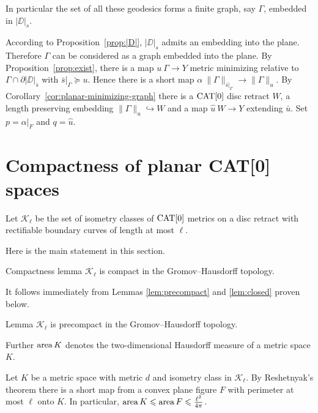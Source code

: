 \documentclass{article}
\begin{document}

In particular the set of all these geodesics forms a finite graph, say $\Gamma$,
embedded in $|\DD|_s$. 

According to Proposition~\ref{prop:|D|},
$|\DD|_s$ admits an embedding into the plane.
Therefore $\Gamma$ can be considered as a graph embedded into the plane.
By Proposition~\ref{prop:exist}, there is a map $u\:\Gamma\to Y$ metric minimizing relative to $\Gamma\cap\partial|\DD|_{\bar s}$ with
$\bar s|_\Gamma\succcurlyeq u$.
Hence there is a short map $\alpha\:\|\Gamma\|_{\bar s|_\Gamma}\to\|\Gamma\|_u$. 
By Corollary~\ref{cor:planar-minimizing-graph} there is a $\mathop{\rm CAT}\nolimits[0]$ disc retract $W$, a length preserving embedding
$\|\Gamma\|_u\hookrightarrow W$ and a map $\hat u\:W\to Y$ extending $\bar u$. %
Set $p=\alpha|_F$ and $q=\hat u$.
\qeds


\section{Compactness of planar CAT[0] spaces}\label{Compactness}

Let $\mathcal{K}_\ell$ be the set of isometry classes of $\mathop{\rm CAT}\nolimits[0]$ metrics on a disc retract with rectifiable
boundary curves of length at most $\ell$.


Here is the main statement in this section.

\begin{thm}{Compactness lemma}\label{lem:compact}
$\mathcal{K}_\ell$ is compact in the Gromov--Hausdorff topology.
\end{thm}

It follows immediately from Lemmas \ref{lem:precompact} and \ref{lem:closed} proven below.

\begin{thm}{Lemma}\label{lem:precompact}
$\mathcal{K}_\ell$ is precompact in the Gromov--Hausdorff topology.
\end{thm}

Further $\mathop{\rm area}\nolimits K$ denotes the two-dimensional Hausdorff measure of a metric space $K$. 

Let $K$ be a metric space with metric $d$ and isometry class in $\mathcal {K}_\ell$.
By Reshetnyak's theorem there is a short map from a convex plane figure $F$ with perimeter at most $\ell$ onto $K$.
In particular, $\mathop{\rm area}\nolimits K \leqslant \mathop{\rm area}\nolimits F \leqslant \tfrac{\ell^2}{4\pi}$.
\end{document}
